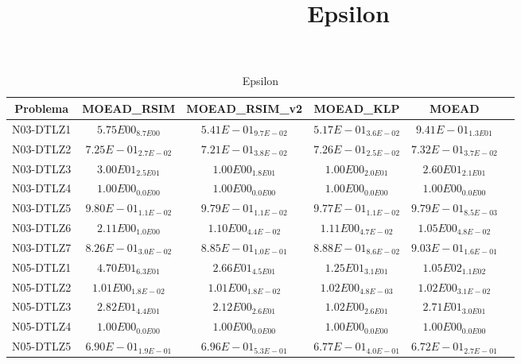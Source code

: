 \documentclass{article}
\title{Epsilon}
\author{}
\begin{document}
\maketitle
\begin{table*}[ht!]
\scriptsize
\caption{Epsilon}
\centering\begin{tabular}{|c||c||c||c||c||c|} \hline
Problema &MOEAD_RSIM &MOEAD_RSIM_v2 &MOEAD_KLP &MOEAD\\\hline
N03-DTLZ1 &$5.75E00_{8.7E00}$ &\cellcolor{gray25}$5.41E-01_{9.7E-02}$ &\cellcolor{gray95}$5.17E-01_{3.6E-02}$ &$9.41E-01_{1.3E01}$\\ 
\hline
N03-DTLZ2 &\cellcolor{gray25}$7.25E-01_{2.7E-02}$ &\cellcolor{gray95}$7.21E-01_{3.8E-02}$ &$7.26E-01_{2.5E-02}$ &$7.32E-01_{3.7E-02}$\\ 
\hline
N03-DTLZ3 &$3.00E01_{2.5E01}$ &\cellcolor{gray95}$1.00E00_{1.8E01}$ &\cellcolor{gray25}$1.00E00_{2.0E01}$ &$2.60E01_{2.1E01}$\\ 
\hline
N03-DTLZ4 &\cellcolor{gray95}$1.00E00_{0.0E00}$ &\cellcolor{gray25}$1.00E00_{0.0E00}$ &$1.00E00_{0.0E00}$ &$1.00E00_{0.0E00}$\\ 
\hline
N03-DTLZ5 &$9.80E-01_{1.1E-02}$ &$9.79E-01_{1.1E-02}$ &\cellcolor{gray95}$9.77E-01_{1.1E-02}$ &\cellcolor{gray25}$9.79E-01_{8.5E-03}$\\ 
\hline
N03-DTLZ6 &$2.11E00_{1.0E00}$ &\cellcolor{gray25}$1.10E00_{4.4E-02}$ &$1.11E00_{4.7E-02}$ &\cellcolor{gray95}$1.05E00_{4.8E-02}$\\ 
\hline
N03-DTLZ7 &\cellcolor{gray95}$8.26E-01_{3.0E-02}$ &\cellcolor{gray25}$8.85E-01_{1.0E-01}$ &$8.88E-01_{8.6E-02}$ &$9.03E-01_{1.6E-01}$\\ 
\hline
N05-DTLZ1 &$4.70E01_{6.3E01}$ &\cellcolor{gray25}$2.66E01_{4.5E01}$ &\cellcolor{gray95}$1.25E01_{3.1E01}$ &$1.05E02_{1.1E02}$\\ 
\hline
N05-DTLZ2 &\cellcolor{gray95}$1.01E00_{1.8E-02}$ &\cellcolor{gray25}$1.01E00_{1.8E-02}$ &$1.02E00_{4.8E-03}$ &$1.02E00_{3.1E-02}$\\ 
\hline
N05-DTLZ3 &$2.82E01_{4.4E01}$ &\cellcolor{gray25}$2.12E00_{2.6E01}$ &\cellcolor{gray95}$1.02E00_{2.6E01}$ &$2.71E01_{3.0E01}$\\ 
\hline
N05-DTLZ4 &\cellcolor{gray95}$1.00E00_{0.0E00}$ &\cellcolor{gray25}$1.00E00_{0.0E00}$ &$1.00E00_{0.0E00}$ &$1.00E00_{0.0E00}$\\ 
\hline
N05-DTLZ5 &$6.90E-01_{1.9E-01}$ &$6.96E-01_{5.3E-01}$ &\cellcolor{gray25}$6.77E-01_{4.0E-01}$ &\cellcolor{gray95}$6.72E-01_{2.7E-01}$\\ 

\end{tabular}
\end{table*}
\end{document}
